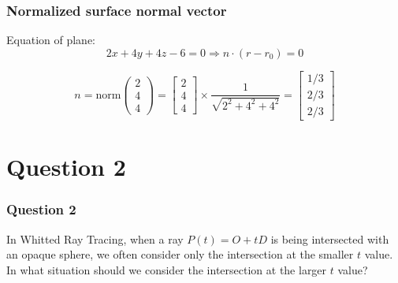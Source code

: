 \documentclass{beamer}
\begin{document}
\begin{frame}
    \frametitle{Normalized surface normal vector}

    \begin{tcolorbox}
        Equation of plane: \\
        \begin{equation*}
            2x + 4y + 4z - 6 = 0 \Rightarrow n \cdot(r - r_0) = 0
        \end{equation*}
    \end{tcolorbox}

    \begin{equation*}
        n = \text{norm} \left( \begin{matrix} 2 \\ 4 \\ 4 \end{matrix} \right) = 
            \left[ \begin{matrix} 2 \\ 4 \\ 4 \end{matrix} \right] \times \frac{1}{\sqrt{2^2 + 4^2 + 4^2}} = 
            \left[ \begin{matrix} 1/3 \\ 2/3 \\ 2/3 \end{matrix} \right]
    \end{equation*}

\end{frame}

\section{Question 2}

\begin{frame}
    \frametitle{Question 2}
    In Whitted Ray Tracing, when a ray $P(t) = O + t D$ is being intersected with an 
    opaque sphere, we often consider only the intersection at the smaller $t$ value. 
    In what situation should we consider the intersection at the larger $t$ value? 

\end{frame}
\end{document}
